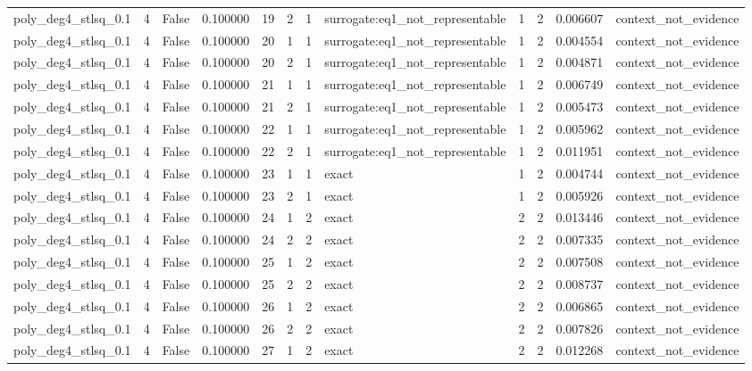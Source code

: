 \begin{tabular}{lrrrrrrlrrrl}
poly\_deg4\_stlsq\_0.1 & 4 & False & 0.100000 & 19 & 2 & 1 & surrogate:eq1\_not\_representable & 1 & 2 & 0.006607 & context\_not\_evidence \\
poly\_deg4\_stlsq\_0.1 & 4 & False & 0.100000 & 20 & 1 & 1 & surrogate:eq1\_not\_representable & 1 & 2 & 0.004554 & context\_not\_evidence \\
poly\_deg4\_stlsq\_0.1 & 4 & False & 0.100000 & 20 & 2 & 1 & surrogate:eq1\_not\_representable & 1 & 2 & 0.004871 & context\_not\_evidence \\
poly\_deg4\_stlsq\_0.1 & 4 & False & 0.100000 & 21 & 1 & 1 & surrogate:eq1\_not\_representable & 1 & 2 & 0.006749 & context\_not\_evidence \\
poly\_deg4\_stlsq\_0.1 & 4 & False & 0.100000 & 21 & 2 & 1 & surrogate:eq1\_not\_representable & 1 & 2 & 0.005473 & context\_not\_evidence \\
poly\_deg4\_stlsq\_0.1 & 4 & False & 0.100000 & 22 & 1 & 1 & surrogate:eq1\_not\_representable & 1 & 2 & 0.005962 & context\_not\_evidence \\
poly\_deg4\_stlsq\_0.1 & 4 & False & 0.100000 & 22 & 2 & 1 & surrogate:eq1\_not\_representable & 1 & 2 & 0.011951 & context\_not\_evidence \\
poly\_deg4\_stlsq\_0.1 & 4 & False & 0.100000 & 23 & 1 & 1 & exact & 1 & 2 & 0.004744 & context\_not\_evidence \\
poly\_deg4\_stlsq\_0.1 & 4 & False & 0.100000 & 23 & 2 & 1 & exact & 1 & 2 & 0.005926 & context\_not\_evidence \\
poly\_deg4\_stlsq\_0.1 & 4 & False & 0.100000 & 24 & 1 & 2 & exact & 2 & 2 & 0.013446 & context\_not\_evidence \\
poly\_deg4\_stlsq\_0.1 & 4 & False & 0.100000 & 24 & 2 & 2 & exact & 2 & 2 & 0.007335 & context\_not\_evidence \\
poly\_deg4\_stlsq\_0.1 & 4 & False & 0.100000 & 25 & 1 & 2 & exact & 2 & 2 & 0.007508 & context\_not\_evidence \\
poly\_deg4\_stlsq\_0.1 & 4 & False & 0.100000 & 25 & 2 & 2 & exact & 2 & 2 & 0.008737 & context\_not\_evidence \\
poly\_deg4\_stlsq\_0.1 & 4 & False & 0.100000 & 26 & 1 & 2 & exact & 2 & 2 & 0.006865 & context\_not\_evidence \\
poly\_deg4\_stlsq\_0.1 & 4 & False & 0.100000 & 26 & 2 & 2 & exact & 2 & 2 & 0.007826 & context\_not\_evidence \\
poly\_deg4\_stlsq\_0.1 & 4 & False & 0.100000 & 27 & 1 & 2 & exact & 2 & 2 & 0.012268 & context\_not\_evidence \\

\end{tabular}
